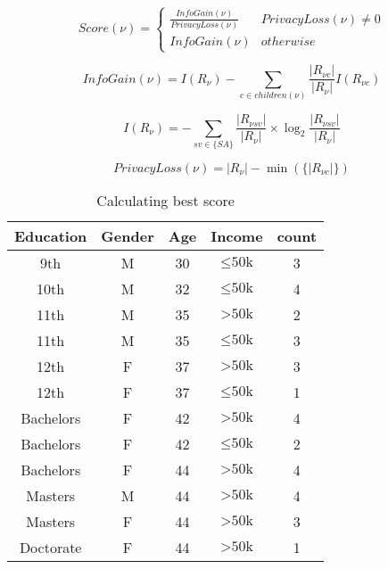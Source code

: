 \documentclass[11pt]{article}       %
\begin{document}
\begin{equation}
Score(\nu) = \begin{cases}
\frac{InfoGain(\nu)} {PrivacyLoss(\nu)} & PrivacyLoss(\nu) \neq 0\\
InfoGain(\nu) & otherwise
\end{cases}
\label{score}
\end{equation}

\begin{equation}
InfoGain(\nu) = I(R_\nu) - \sum\limits_{\text{$c$} \in children(\nu)} \frac{|R_{\nu\text{$c$}}|}{|R_\nu|} I(R_{\nu\text{$c$}})
\label{infoGain}
\end{equation}

\begin{equation}
I(R_\nu) = - \sum\limits_{sv \in \text{\{$SA$\}}} \frac{| R_{\nu\text{$sv$}} |}{ | R_\nu |} \times \log_2 \frac{| R_{\nu\text{$sv$}} |}{ | R_\nu |}
\label{entropy}
\end{equation}

\begin{equation}
PrivacyLoss(\nu) = |R_\nu| - \min(\{|R_{\nu c}|\})
\label{privacyLoss}
\end{equation}

\begin{table}[htp]
\begin{center}
\begin{tabular}{|c|c|c|c|c|}
\hline
Education & Gender & Age & Income & count \\
\hline
9th & M & 30 & $\leq \text{50k}$ & 3 \\
10th & M & 32 & $\leq \text{50k}$ & 4 \\
11th & M & 35 & $> \text{50k}$ & 2 \\
11th & M & 35 & $\leq \text{50k}$ & 3 \\
12th & F & 37 & $> \text{50k}$ & 3 \\
12th & F & 37 & $\leq \text{50k}$ & 1 \\
\hline
Bachelors & F & 42 & $> \text{50k}$ & 4 \\
Bachelors & F & 42 & $\leq \text{50k}$ & 2 \\
Bachelors & F & 44 & $> \text{50k}$ & 4 \\
Masters & M & 44 & $> \text{50k}$ & 4 \\
Masters & F & 44 & $> \text{50k}$ & 3 \\
Doctorate & F & 44 & $> \text{50k}$ & 1 \\
\hline
\end{tabular}
\end{center}
\label{table2}
\caption{Calculating best score}
\end{table}
\end{document}
